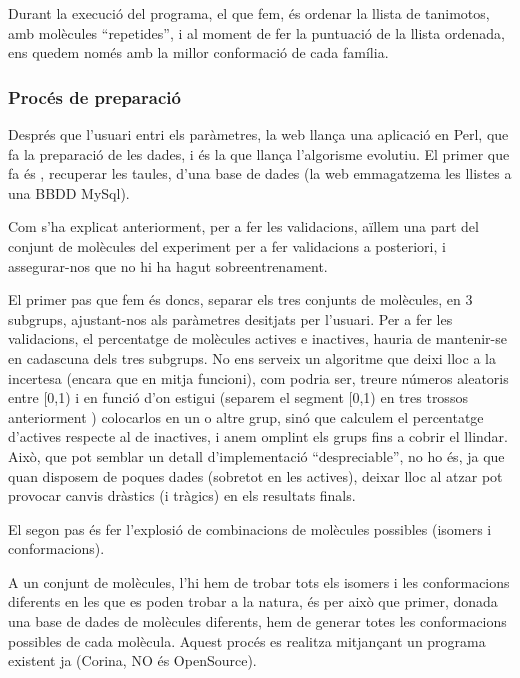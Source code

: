 \documentclass[titlepage,a4paper,12pt]{book}
\begin{document}
Durant la execució del programa, el que fem, és ordenar la llista de tanimotos,
amb molècules ``repetides'', i al moment de fer la puntuació de la llista
ordenada, ens quedem només amb la millor conformació de cada família.

\subsubsection{Procés de preparació} %
\label{ssub:Proces de preparacio}

Després que l'usuari entri els paràmetres, la web llança una aplicació en Perl,
que fa la preparació de les dades, i és la que llança l'algorisme evolutiu.  El
primer que fa és , recuperar les taules, d'una base de dades (la web emmagatzema
les llistes a una BBDD MySql).

Com s'ha explicat anteriorment, per a fer les validacions, aïllem una part del
conjunt de molècules del experiment per a fer validacions a posteriori, i
assegurar-nos que no hi ha hagut sobreentrenament.

El primer pas que fem és doncs, separar els tres conjunts de molècules, en 3
subgrups, ajustant-nos als paràmetres desitjats per l'usuari.  Per a fer les
validacions, el percentatge de molècules actives e inactives, hauria de
mantenir-se en cadascuna dels tres subgrups. No ens serveix un algoritme que
deixi lloc a la incertesa (encara que en mitja funcioni), com podria ser, treure
números aleatoris entre [0,1) i en funció d'on estigui (separem el segment [0,1)
en tres trossos anteriorment ) colocarlos en un o altre grup, sinó que calculem
el percentatge d'actives respecte al de inactives, i anem omplint els grups fins
a cobrir el llindar.  Això, que pot semblar un detall d'implementació
``despreciable'', no ho és, ja que quan disposem de poques dades (sobretot en
les actives), deixar lloc al atzar pot provocar canvis dràstics (i tràgics) en
els resultats finals.


El segon pas és fer l'explosió de combinacions de molècules possibles (isomers i
conformacions).

A un conjunt de molècules, l'hi hem de trobar tots els isomers i les
conformacions diferents en les que es poden trobar a la natura, és per això que
primer, donada una base de dades de molècules diferents, hem de generar totes
les conformacions possibles de cada molècula.  Aquest procés es realitza
mitjançant un programa existent ja (Corina, NO és OpenSource).
\end{document}
